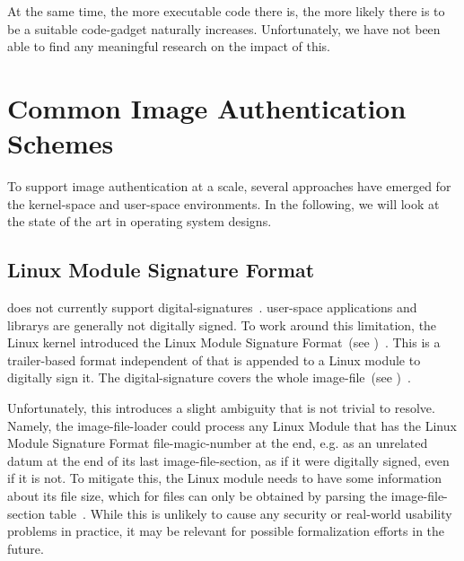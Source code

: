 At the same time, the more executable code there is, the more likely there is to be a suitable \gls{code-gadget} naturally increases. Unfortunately, we have not been able to find any meaningful research on the impact of this.

\section{Common Image Authentication Schemes}
\label{sec:cmn_sigs}

To support \gls{image} authentication at a scale, several approaches have emerged for the \gls{kernel-space} and \gls{user-space} environments. In the following, we will look at the state of the art in operating system designs.

\subsection{Linux Module Signature Format}

 does not currently support \glspl{digital-signature}~\cite{elf-spec}. \Gls{user-space} applications and \glspl{library} are generally not digitally signed. To work around this limitation, the Linux kernel introduced the Linux Module Signature Format~(see )~\cite{linux}. This is a trailer-based format independent of  that is appended to a Linux module to digitally sign it. The \gls{digital-signature} covers the whole \gls{image-file}~(see )~\cite{linux}.

Unfortunately, this introduces a slight ambiguity that is not trivial to resolve. Namely, the \gls{image-file-loader} could process any Linux Module that has the Linux Module Signature Format \gls{file-magic-number} at the end, e.g. as an unrelated datum at the end of its last \gls{image-file-section}, as if it were digitally signed, even if it is not. To mitigate this, the Linux module needs to have some information about its file size, which for  files can only be obtained by parsing the \gls{image-file-section} table~\cite{elf-spec}. While this is unlikely to cause any security or real-world usability problems in practice, it may be relevant for possible formalization efforts in the future.


